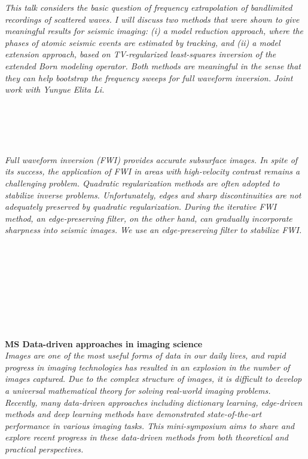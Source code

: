\begin{multicols}{2}
      \textit{This talk considers the basic question of frequency extrapolation of bandlimited recordings of scattered waves. I will discuss two methods that were shown to give meaningful results for seismic imaging: (i) a model reduction approach, where the phases of atomic seismic events are estimated by tracking, and (ii) a model extension approach, based on TV-regularized least-squares inversion of the extended Born modeling operator. Both methods are meaningful in the sense that they can help bootstrap the frequency sweeps for full waveform inversion. Joint work with Yunyue Elita Li.}\\
\\ 
        \\
        \\\\
\\
      \textit{Full waveform inversion (FWI) provides accurate subsurface images. In spite of its success, the application of FWI in areas with high-velocity contrast remains a challenging problem.  Quadratic regularization methods are often adopted to stabilize inverse problems. Unfortunately, edges and sharp discontinuities are not adequately preserved by quadratic regularization. During the iterative FWI method, an edge-preserving filter, on the other hand, can gradually incorporate sharpness into seismic images. We use an edge-preserving filter to stabilize FWI.}\\
\\ 
        \\
        \\\\
        \\
        \\\\
\\
\end{multicols}
  \noindent\textbf{MS Data-driven approaches in imaging science}\\
  \textit{Images are one of the most useful forms of data in our daily lives, and rapid progress in imaging technologies has resulted in an explosion in the number of images captured. Due to the complex structure of images, it is difficult to develop a universal mathematical theory for solving real-world imaging problems. Recently, many data-driven approaches including dictionary learning, edge-driven methods and deep learning methods have demonstrated state-of-the-art performance in various imaging tasks. This mini-symposium aims to share and explore recent progress in these data-driven methods from both theoretical and practical perspectives.} \\
    
